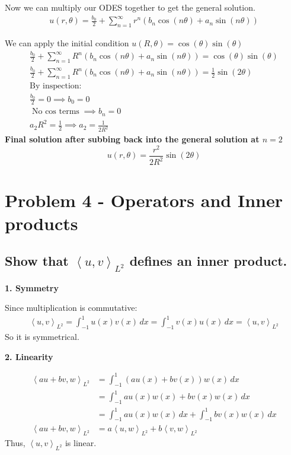\documentclass[11pt]{article}
\begin{document}
    Now we can multiply our ODES together to get the general solution.
    \begin{gather*}
        u(r,\theta) = \frac{b_0}{2} + \sum_{n=1}^{\infty} r^n (b_n \cos(n\theta) + a_n \sin(n \theta))
    \end{gather*}

    We can apply the initial condition $u(R,\theta) = \cos(\theta) \sin(\theta)$
    \begin{gather*}
        \frac{b_0}{2} + \sum_{n=1}^{\infty} R^n (b_n \cos(n\theta) + a_n \sin(n \theta) )= \cos(\theta) \sin(\theta)\\
        \frac{b_0}{2} + \sum_{n=1}^{\infty} R^n (b_n \cos(n\theta) + a_n \sin(n \theta) )= \frac{1}{2}\sin(2\theta)\\
        \text{By inspection:}\\
        \frac{b_0}{2} = 0 \implies b_0 = 0\\
        \text{No $\cos$ terms} \implies b_n =0\\
        a_2 R^2 = \frac{1}{2} \implies a_2 = \frac{1}{2R^2}
    \end{gather*}
    \textbf{Final solution after subbing back into the general solution at $n=2$}
    \[
        u(r,\theta) = \frac{r^2}{2R^2} \sin(2\theta)
    \]
    \newpage
    \section*{Problem 4 - Operators and Inner products}
    \setcounter{subsection}{0}
    \subsection{Show that $\left<u,v\right>_{L^2}$ defines an inner product.}
    \textbf{1. Symmetry}

    Since multiplication is commutative:
    \begin{gather*}
        \left<u,v\right>_{L^2} = \int_{-1}^{1} u(x)v(x)\,dx = \int_{-1}^{1} v(x)u(x)\,dx = \left<u,v\right>_{L^2}
    \end{gather*}
    So it is symmetrical.

    \textbf{2. Linearity}

    \begin{align*}
        \left<au+bv,w\right>_{L^2} &= \int_{-1}^{1} (au(x)+bv(x)) w(x) \,dx\\
        &= \int_{-1}^{1} au(x)w(x)+bv(x)w(x) \,dx\\
        &= \int_{-1}^{1} au(x)w(x) \,dx + \int_{-1}^{1} bv(x)w(x) \,dx\\
        \left<au+bv,w\right>_{L^2} &= a\left<u,w\right>_{L^2}+ b \left<v,w\right>_{L^2}
    \end{align*}
    Thus, $\left<u,v\right>_{L^2}$ is linear.
\end{document}
